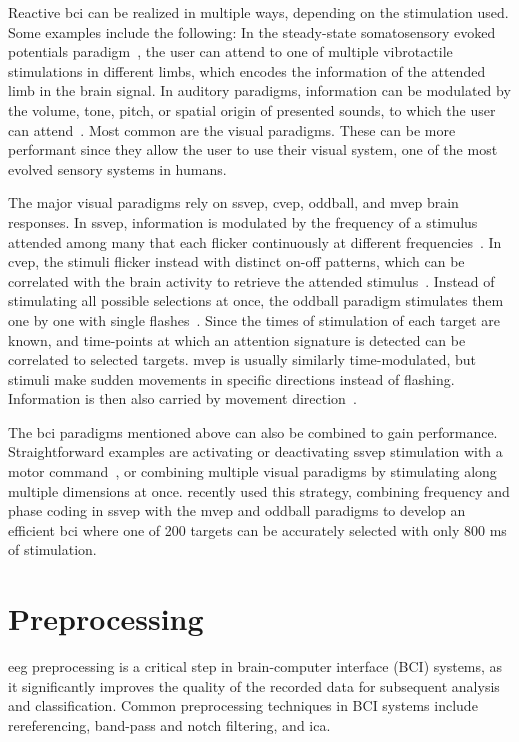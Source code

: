 Reactive \ac{bci} can be realized in multiple ways, depending on the stimulation used.
Some examples include the following:
In the steady-state somatosensory evoked potentials paradigm~\cite{Petit2021}, the user
can attend to one of multiple vibrotactile stimulations in different limbs, which
encodes the information of the attended limb in the brain signal.
In auditory paradigms, information can be modulated by the volume, tone, pitch, or
spatial origin of presented sounds, to which the user can attend~\cite{Kaongoen2017}.
Most common are the visual paradigms.
These can be more performant since they allow the user to use their visual system, one
of the most evolved sensory systems in humans.

The major visual paradigms rely on \ac{ssvep}, \ac{cvep}, oddball, and \ac{mvep} brain
responses.
In \ac{ssvep}, information is modulated by the frequency of a stimulus attended among
many that each flicker continuously at different frequencies~\cite{Chen2021}.
In \ac{cvep}, the stimuli flicker instead with distinct on-off patterns, which can be
correlated with the brain activity to retrieve the attended stimulus~\cite{Sun2022}.
Instead of stimulating all possible selections at once, the oddball paradigm stimulates
them one by one with single flashes~\cite{Pan2022}.
Since the times of stimulation of each target are known, and time-points at which an
attention signature is detected can be correlated to selected targets.
\Ac{mvep} is usually similarly time-modulated, but stimuli make sudden movements in
specific directions instead of flashing.
Information is then also carried by movement direction~\cite{Libert2021a,Libert2022}.

The \ac{bci} paradigms mentioned above can also be combined to gain performance.
Straightforward examples are activating or deactivating \ac{ssvep} stimulation with a
motor command~\cite{Neeling2019}, or combining multiple visual pa\-ra\-digms by stimulating
along multiple dimensions at once.
\textcite{Han2023} recently used this strategy, combining frequency and phase coding in
\ac{ssvep} with the \ac{mvep} and oddball paradigms to develop an efficient \ac{bci}
where one of 200 targets can be accurately selected with only 800 ms of stimulation.

\section{Preprocessing}
\label{sec:bci/preprocessing}

\ac{eeg} preprocessing is a critical step in brain-computer interface (BCI) systems, as
it significantly improves the quality of the recorded data for subsequent analysis and
classification.
Common preprocessing techniques in BCI systems include rereferencing, band-pass and
notch filtering, and \ac{ica}.

